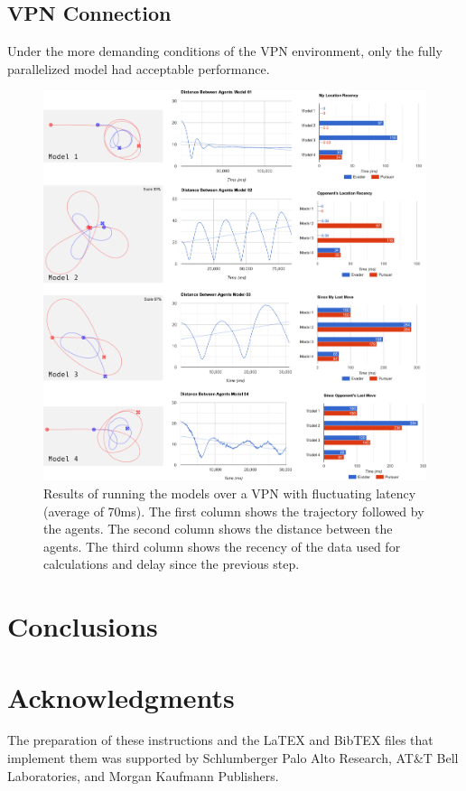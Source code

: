 \documentclass{article}
\begin{document}
\subsection{VPN Connection} 
Under the more demanding conditions of the VPN environment, only the fully parallelized model had acceptable performance.

\begin{figure}
	\centering
	\includegraphics[width=17.0cm]{charts-vpn}
	\caption{Results of running the models over a VPN with fluctuating latency (average of 70ms). The first column shows the trajectory followed by the agents. The second column shows the distance between the agents. The third column shows the recency of the data used for calculations and delay since the previous step.}\label{fig:charts-vpn}
\end{figure}



\section{Conclusions}

\section*{Acknowledgments}
The preparation of these instructions and the LaTEX and BibTEX files that implement them was supported by Schlumberger Palo Alto Research, AT\&T Bell Laboratories, and Morgan Kaufmann Publishers.


%
%


\end{document}
